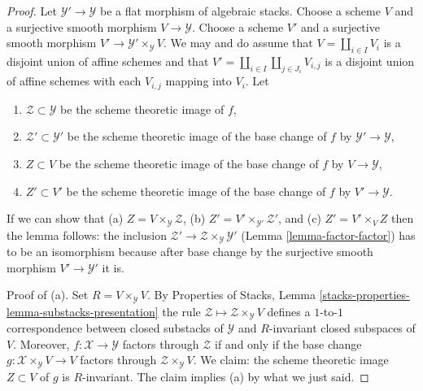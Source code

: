 \begin{proof}
Let $\mathcal{Y}' \to \mathcal{Y}$ be a flat morphism of algebraic stacks.
Choose a scheme $V$ and a surjective smooth morphism $V \to \mathcal{Y}$.
Choose a scheme $V'$ and a
surjective smooth morphism $V' \to \mathcal{Y}' \times_\mathcal{Y} V$.
We may and do assume that $V = \coprod_{i \in I} V_i$ is a disjoint
union of affine schemes and that
$V' = \coprod_{i \in I} \coprod_{j \in J_i} V_{i, j}$
is a disjoint union of affine schemes with each $V_{i, j}$ mapping into $V_i$.
Let
\begin{enumerate}
\item $\mathcal{Z} \subset \mathcal{Y}$ be the scheme theoretic image of $f$,
\item $\mathcal{Z}' \subset \mathcal{Y}'$ be the scheme theoretic image
of the base change of $f$ by $\mathcal{Y}' \to \mathcal{Y}$,
\item $Z \subset V$ be the scheme theoretic image
of the base change of $f$ by $V \to \mathcal{Y}$,
\item $Z' \subset V'$ be the scheme theoretic image
of the base change of $f$ by $V' \to \mathcal{Y}$.
\end{enumerate}
If we can show that
(a) $Z = V \times_\mathcal{Y} \mathcal{Z}$,
(b) $Z' = V' \times_{\mathcal{Y}'} \mathcal{Z}'$, and
(c) $Z' = V' \times_V Z$
then the lemma follows: the inclusion
$\mathcal{Z}' \to \mathcal{Z} \times_\mathcal{Y} \mathcal{Y}'$
(Lemma \ref{lemma-factor-factor})
has to be an isomorphism because after base change by the surjective
smooth morphism $V' \to \mathcal{Y}'$ it is.

\medskip\noindent
Proof of (a). Set $R = V \times_\mathcal{Y} V$.
By Properties of Stacks, Lemma
\ref{stacks-properties-lemma-substacks-presentation}
the rule $\mathcal{Z} \mapsto \mathcal{Z} \times_\mathcal{Y} V$
defines a $1$-to-$1$ correspondence between closed substacks
of $\mathcal{Y}$ and $R$-invariant closed subspaces of $V$.
Moreover, $f : \mathcal{X} \to \mathcal{Y}$ factors through $\mathcal{Z}$
if and only if the base change
$g : \mathcal{X} \times_\mathcal{Y} V \to V$ factors through
$\mathcal{Z} \times_\mathcal{Y} V$.
We claim: the scheme theoretic image $Z \subset V$ of $g$
is $R$-invariant. The claim implies (a) by what we just said.


\end{proof}
